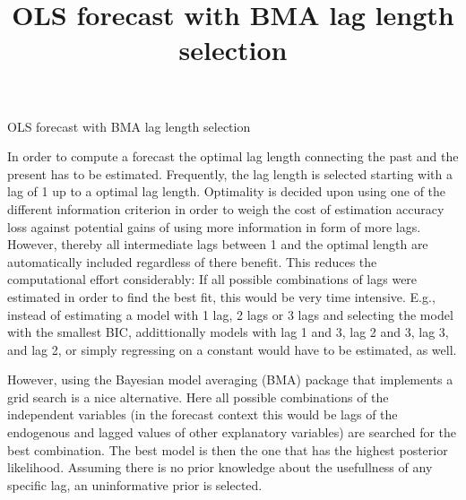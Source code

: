 \documentclass[]{article}
\title{OLS forecast with BMA lag length selection}
\author{}
\date{}
\begin{document}
\begin{center}
\huge OLS forecast with BMA lag length selection \\[0.2cm]
\normalsize
\end{center}


In order to compute a forecast the optimal lag length connecting the
past and the present has to be estimated. Frequently, the lag length is
selected starting with a lag of 1 up to a optimal lag length. Optimality
is decided upon using one of the different information criterion in
order to weigh the cost of estimation accuracy loss against potential
gains of using more information in form of more lags. However, thereby
all intermediate lags between 1 and the optimal length are automatically
included regardless of there benefit. This reduces the computational
effort considerably: If all possible combinations of lags were estimated
in order to find the best fit, this would be very time intensive. E.g.,
instead of estimating a model with 1 lag, 2 lags or 3 lags and selecting
the model with the smallest BIC, addittionally models with lag 1 and 3,
lag 2 and 3, lag 3, and lag 2, or simply regressing on a constant would
have to be estimated, as well.

However, using the Bayesian model averaging (BMA) package that
implements a grid search is a nice alternative. Here all possible
combinations of the independent variables (in the forecast context this
would be lags of the endogenous and lagged values of other explanatory
variables) are searched for the best combination. The best model is then
the one that has the highest posterior likelihood. Assuming there is no
prior knowledge about the usefullness of any specific lag, an
uninformative prior is selected.
\end{document}

